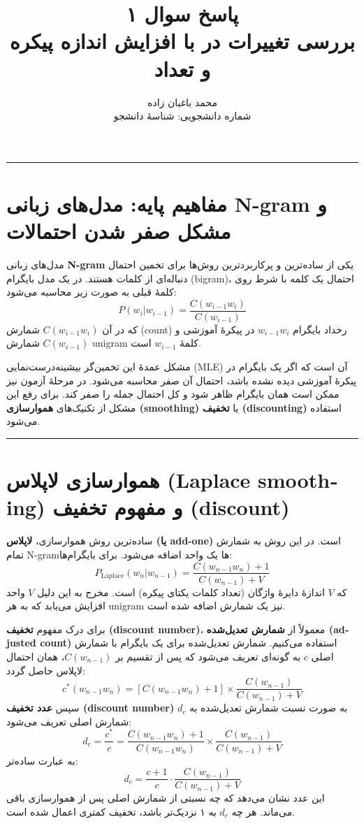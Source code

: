 \documentclass[11pt,a4paper]{article}
\title{\textbf{پاسخ سوال ۱} \\[0.4cm] \small بررسی تغییرات \en{discount numbers ($d$)} در \en{Laplace smoothing} با افزایش اندازه پیکره و تعداد \en{bigrams}}
\author{محمد باغبان زاده \\ شماره دانشجویی: شناسهٔ دانشجو}
\date{}
\newcommand{\en}[1]{\textenglish{#1}}
\newcommand{\separator}{\vspace{1em}\noindent\rule{\linewidth}{0.4pt}\vspace{1em}}
\newcommand{\thickseparator}{\vspace{1em}\noindent\rule{\linewidth}{1pt}\vspace{1em}}
\begin{document}
\maketitle
\thickseparator

\section{مفاهیم پایه: مدل‌های زبانی N-gram و مشکل صفر شدن احتمالات}
مدل‌های زبانی \textbf{N-gram} یکی از ساده‌ترین و پرکاربردترین روش‌ها برای تخمین احتمال دنباله‌ای از کلمات هستند. در یک مدل بایگرام (bigram)، احتمال یک کلمه با شرط روی کلمهٔ قبلی به صورت زیر محاسبه می‌شود:
\[
P(w_i | w_{i-1}) = \frac{C(w_{i-1} w_i)}{C(w_{i-1})}
\]
که در آن \(C(w_{i-1} w_i)\) شمارش (count) رخداد بایگرام \(w_{i-1} w_i\) در پیکرهٔ آموزشی و \(C(w_{i-1})\) شمارش unigram کلمهٔ \(w_{i-1}\) است.

مشکل عمدهٔ این تخمین‌گر بیشینه‌درست‌نمایی (MLE) آن است که اگر یک بایگرام در پیکرهٔ آموزشی دیده نشده باشد، احتمال آن صفر محاسبه می‌شود. در مرحلهٔ آزمون نیز ممکن است همان بایگرام ظاهر شود و کل احتمال جمله را صفر کند. برای رفع این مشکل از تکنیک‌های \textbf{هموارسازی (smoothing)} یا \textbf{تخفیف (discounting)} استفاده می‌شود.

\separator
\section{هموارسازی لاپلاس \en{(Laplace smoothing)} و مفهوم تخفیف (discount)}
ساده‌ترین روش هموارسازی، \textbf{لاپلاس \en{(یا add-one)}} است. در این روش به شمارش تمام \en{N-gram}ها یک واحد اضافه می‌شود. برای بایگرام‌ها:
\[
P_{\text{Laplace}}(w_n | w_{n-1}) = \frac{C(w_{n-1}w_n) + 1}{C(w_{n-1}) + V}
\]
که \(V\) اندازهٔ دایرهٔ واژگان (تعداد کلمات یکتای پیکره) است. مخرج به این دلیل \(V\) واحد افزایش می‌یابد که به هر unigram نیز یک شمارش اضافه شده است.

برای درک مفهوم \textbf{تخفیف \en{(discount number)}}، معمولاً از \textbf{شمارش تعدیل‌شده \en{(adjusted count)}} استفاده می‌کنیم. شمارش تعدیل‌شده برای یک بایگرام با شمارش اصلی \(c\) به گونه‌ای تعریف می‌شود که پس از تقسیم بر \(C(w_{n-1})\)، همان احتمال لاپلاس حاصل گردد:
\[
c^*(w_{n-1}w_n) = [C(w_{n-1}w_n) + 1] \times \frac{C(w_{n-1})}{C(w_{n-1}) + V}
\]
سپس \textbf{عدد تخفیف \en{(discount number)}} \(d_c\) به صورت نسبت شمارش تعدیل‌شده به شمارش اصلی تعریف می‌شود:
\[
d_c = \frac{c^*}{c} = \frac{C(w_{n-1}w_n) + 1}{C(w_{n-1}w_n)} \times \frac{C(w_{n-1})}{C(w_{n-1}) + V}
\]
به عبارت ساده‌تر:
\[
d_c = \frac{c+1}{c} \cdot \frac{C(w_{n-1})}{C(w_{n-1}) + V}
\]
این عدد نشان می‌دهد که چه نسبتی از شمارش اصلی پس از هموارسازی باقی می‌ماند. هر چه \(d_c\) به ۱ نزدیک‌تر باشد، تخفیف کمتری اعمال شده است.
\end{document}
